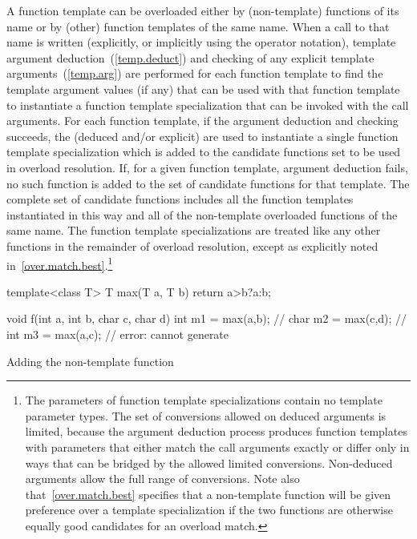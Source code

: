 \pnum
{}%
A function template can be overloaded either by (non-template) functions of its
name or by (other) function templates of the same name.
When a call to that name is written (explicitly, or implicitly using the
operator notation), template argument deduction~(\ref{temp.deduct})
and checking of any explicit template arguments~(\ref{temp.arg}) are performed
for each function template to find the template argument values (if any) that
can be used with that function template to instantiate a function template
specialization that can be invoked with the call arguments.
For each function template, if the argument deduction and checking succeeds,
the
(deduced and/or explicit)
are used to instantiate a single function template specialization which is
added to the candidate functions set to be used in overload resolution.
If, for a given function template, argument deduction fails, no such function
is added to the set of candidate functions for that template.
The complete set of candidate functions includes all the function templates
instantiated in this way and all of the non-template overloaded functions of
the same name. The function template specializations are treated like any
other functions in
the remainder of overload resolution, except as explicitly noted
in~\ref{over.match.best}.\footnote{The parameters of function template
specializations contain no
template parameter types.
The set of conversions allowed on deduced arguments is limited, because the
argument deduction process produces function templates with parameters that
either match the call arguments exactly or differ only in ways that can be
bridged by the allowed limited conversions.
Non-deduced arguments allow the full range of conversions.
Note also that~\ref{over.match.best} specifies that a non-template function will
be given preference over a template specialization if the two functions
are otherwise equally good candidates for an overload match.}

\pnum
\enterexample
\begin{codeblock}
template<class T> T max(T a, T b) { return a>b?a:b; }

void f(int a, int b, char c, char d)
{
	int m1 = max(a,b);	// 
	char m2 = max(c,d);	// 
	int m3 = max(a,c);	// error: cannot generate 
}
\end{codeblock}

\pnum
Adding the non-template function


